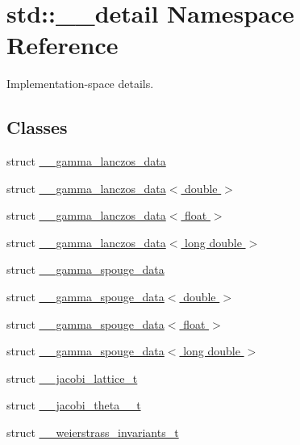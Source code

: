 \hypertarget{namespacestd_1_1____detail}{}\section{std\+:\+:\+\_\+\+\_\+detail Namespace Reference}
\label{namespacestd_1_1____detail}


Implementation-\/space details.  


\subsection*{Classes}
\begin{DoxyCompactItemize}
\item 
struct \hyperlink{structstd_1_1____detail_1_1____gamma__lanczos__data}{\+\_\+\+\_\+gamma\+\_\+lanczos\+\_\+data}
\item 
struct \hyperlink{structstd_1_1____detail_1_1____gamma__lanczos__data_3_01double_01_4}{\+\_\+\+\_\+gamma\+\_\+lanczos\+\_\+data$<$ double $>$}
\item 
struct \hyperlink{structstd_1_1____detail_1_1____gamma__lanczos__data_3_01float_01_4}{\+\_\+\+\_\+gamma\+\_\+lanczos\+\_\+data$<$ float $>$}
\item 
struct \hyperlink{structstd_1_1____detail_1_1____gamma__lanczos__data_3_01long_01double_01_4}{\+\_\+\+\_\+gamma\+\_\+lanczos\+\_\+data$<$ long double $>$}
\item 
struct \hyperlink{structstd_1_1____detail_1_1____gamma__spouge__data}{\+\_\+\+\_\+gamma\+\_\+spouge\+\_\+data}
\item 
struct \hyperlink{structstd_1_1____detail_1_1____gamma__spouge__data_3_01double_01_4}{\+\_\+\+\_\+gamma\+\_\+spouge\+\_\+data$<$ double $>$}
\item 
struct \hyperlink{structstd_1_1____detail_1_1____gamma__spouge__data_3_01float_01_4}{\+\_\+\+\_\+gamma\+\_\+spouge\+\_\+data$<$ float $>$}
\item 
struct \hyperlink{structstd_1_1____detail_1_1____gamma__spouge__data_3_01long_01double_01_4}{\+\_\+\+\_\+gamma\+\_\+spouge\+\_\+data$<$ long double $>$}
\item 
struct \hyperlink{structstd_1_1____detail_1_1____jacobi__lattice__t}{\+\_\+\+\_\+jacobi\+\_\+lattice\+\_\+t}
\item 
struct \hyperlink{structstd_1_1____detail_1_1____jacobi__theta__0__t}{\+\_\+\+\_\+jacobi\+\_\+theta\+\_\+\_\+t}
\item 
struct \hyperlink{structstd_1_1____detail_1_1____weierstrass__invariants__t}{\+\_\+\+\_\+weierstrass\+\_\+invariants\+\_\+t}

\end{DoxyCompactItemize}
